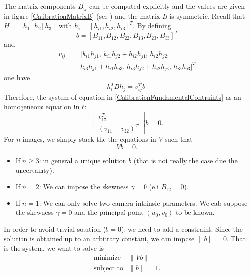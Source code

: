 \documentclass[11pt,a4paper]{article}
\begin{document}
The matrix components $B_{ij}$ can be computed explicitly and the values are given in figure \ref{CalibrationMatrixB} (see \cite{Zhang2000}) and the matrix $B$ is symmetric. Recall that $ H = [h_1 \,|\,h_2 \,|\,h_3 ]$ with $h_i = [h_{i1},h_{i2},h_{i3}]^T$. By defining 
\begin{equation}
b = [B_{11},B_{12},B_{22},B_{13},B_{23},B_{33}]^T 
\end{equation}
and 
\begin{align*}
v_{ij} = & [h_{i1}h_{j1}, \, h_{i1}h_{j2}+h_{i2}h_{j1}, \, h_{i2}h_{j2}, \, \\
		 & h_{i3}h_{j1}+h_{i1}h_{j3}, \, h_{i3}h_{j2}+h_{i2}h_{j3}, \, h_{i3}h_{j3}]^T
\end{align*}
one have
\begin{equation}
h_i^T B h_j = v_{ij}^T b.
\end{equation}
Therefore, the system of equation in \eqref{CalibrationFundamentalContraints} as an homogeneous equation in $b$:
\begin{equation}
\left[
\begin{array}{cc}
v_{12}^T \\
(v_{11} - v_{22})^T
\end{array}
\right]
b = 0.
\end{equation}
For $n$ images, we simply stack the the equations in $V$ such that 
\begin{equation}
V b = 0.
\end{equation}
\begin{itemize}
\item If $n \geq 3$: in general a unique solution $b$ (that is not really the case due the uncertainty).
\item If $n=2$: We can impose the skewness $\gamma = 0$ (e.i $B_{12}=0$).
\item If $n=1$: We can only solve two camera intrinsic parameters. We cab suppose the skewness $\gamma = 0$ and the principal point $(u_0,v_0)$ to be known.
\end{itemize}
In order to avoid trivial solution ($b=0$), we need to add a constraint. Since the solution is obtained up to an arbitrary constant, we can impose $\| b\| = 0$. That is the system, we want to solve is
\begin{equation}
\begin{array}{lc}
\text{minimize} & \|Vb\| \\
\text{subject to} & \| b\| = 1.
\end{array}
\end{equation}
\end{document}
